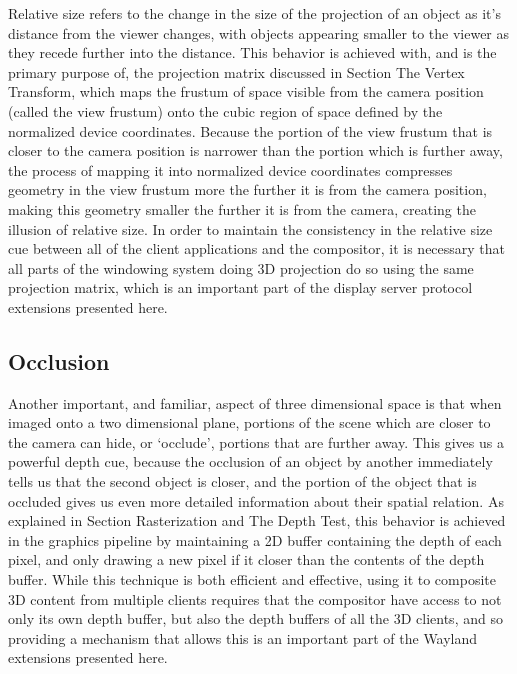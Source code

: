 Relative size refers to the change in the size of the projection of an object as it’s distance from the viewer changes, with objects appearing smaller to the viewer as they recede further into the distance. This behavior is achieved with, and is the primary purpose of, the projection matrix discussed in Section {The Vertex Transform}, which maps the frustum of space visible from the camera position (called the view frustum) onto the cubic region of space defined by the normalized device coordinates. Because the portion of the view frustum that is closer to the camera position is narrower than the portion which is further away, the process of mapping it into normalized device coordinates compresses geometry in the view frustum more the further it is from the camera position, making this geometry smaller the further it is from the camera, creating the illusion of relative size. In order to maintain the consistency in the relative size cue between all of the client applications and the compositor, it is necessary that all parts of the windowing system doing 3D projection do so using the same projection matrix, which is an important part of the display server protocol extensions presented here.

\subsection{Occlusion}

Another important, and familiar, aspect of three dimensional space is that when imaged onto a two dimensional plane, portions of the scene which are closer to the camera can hide, or ‘occlude’, portions that are further away. This gives us a powerful depth cue, because the occlusion of an object by another immediately tells us that the second object is closer, and the portion of the object that is occluded gives us even more detailed information about their spatial relation. As explained in Section {Rasterization and The Depth Test}, this behavior is achieved in the graphics pipeline by maintaining a 2D buffer containing the depth of each pixel, and only drawing a new pixel if it closer than the contents of the depth buffer. While this technique is both efficient and effective, using it to composite 3D content from multiple clients requires that the compositor have access to not only its own depth buffer, but also the depth buffers of all the 3D clients, and so providing a mechanism that allows this is an important part of the Wayland extensions presented here. 

